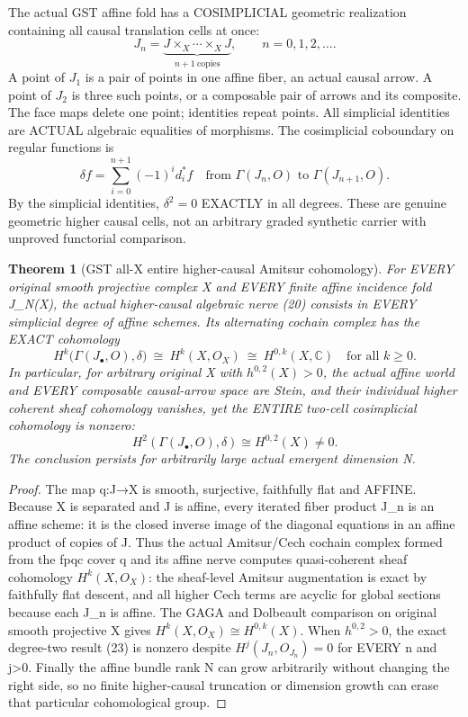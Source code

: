 \documentclass[11pt]{article}
\newtheorem{theorem}{Theorem}
\begin{document}
The actual GST affine fold has a
COSIMPLICIAL geometric realization
containing all causal translation
cells at once:
\[
 J_n=\underbrace{J\times_X\cdots
                  \times_XJ}_{n+1\ \mathrm{copies}},
 \qquad n=0,1,2,\dots .
                                                             \tag{20}
\]
A point of $J_1$ is a pair of points
in one affine fiber, an actual causal
arrow. A point of $J_2$ is three such
points, or a composable pair of
arrows and its composite. The face
maps delete one point; identities
repeat points. All simplicial
identities are ACTUAL algebraic
equalities of morphisms. The
cosimplicial coboundary on regular
functions is
\[
 \boxed{
 \delta f=\sum_{i=0}^{n+1}
   (-1)^i d_i^*f\quad
   \text{from }\Gamma(J_n,O)
   \text{ to }\Gamma(J_{n+1},O).
 }                                                       \tag{21}
\]
By the simplicial identities,
$\delta^2=0$ EXACTLY in all
degrees. These are genuine
geometric higher causal cells,
not an arbitrary graded synthetic
carrier with unproved functorial
comparison.

\begin{theorem}[GST all-X entire higher-causal Amitsur cohomology]
For EVERY original smooth projective
complex X and EVERY finite affine
incidence fold J_N(X), the actual
higher-causal algebraic nerve (20)
consists in EVERY simplicial
degree of affine schemes.
Its alternating cochain complex
has the EXACT cohomology
\[
 \boxed{
 H^k\bigl(\Gamma(J_\bullet,O),
                         \delta\bigr)
       \ \cong\
 H^k(X,O_X)
       \ \cong\
 H^{0,k}(X,\mathbb C)
 \quad\text{for all }k\ge0.
 }                                                       \tag{22}
\]
In particular, for arbitrary
original X with $h^{0,2}(X)>0$,
the actual affine world and
EVERY composable causal-arrow
space are Stein, and their
individual higher coherent
sheaf cohomology vanishes,
yet the ENTIRE two-cell
cosimplicial cohomology is
nonzero:
\[
 \boxed{
 H^2(\Gamma(J_\bullet,O),\delta)
       \cong H^{0,2}(X)\ne0.
 }                                                       \tag{23}
\]
The conclusion persists for
arbitrarily large actual
emergent dimension N.
\end{theorem}
\begin{proof}
The map q:J→X is smooth,
surjective, faithfully flat
and AFFINE. Because X is
separated and J is affine,
every iterated fiber product
J_n is an affine scheme:
it is the closed inverse image
of the diagonal equations
in an affine product of copies
of J. Thus the actual
Amitsur/Cech cochain complex
formed from the fpqc cover
q and its affine nerve
computes quasi-coherent sheaf
cohomology $H^k(X,O_X)$:
the sheaf-level Amitsur
augmentation is exact by
faithfully flat descent, and
all higher Cech terms are
acyclic for global sections
because each J_n is affine.
The GAGA and Dolbeault
comparison on original
smooth projective X gives
$H^k(X,O_X)\cong H^{0,k}(X)$.
When $h^{0,2}>0$, the exact
degree-two result (23)
is nonzero despite
$H^j(J_n,O_{J_n})=0$
for EVERY n and j>0.
Finally the affine bundle
rank N can grow arbitrarily
without changing the
right side, so no finite
higher-causal truncation
or dimension growth can
erase that particular
cohomological group.
\end{proof}
\end{document}
